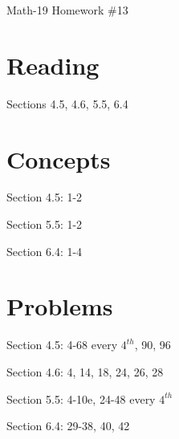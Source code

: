\documentclass[letterpaper,12pt,fleqn]{article}
\begin{document}
\begin{center}
\Large Math-19 Homework \#13
\end{center}

\section*{Reading}

Sections 4.5, 4.6, 5.5, 6.4

\section*{Concepts}

Section 4.5: 1-2

Section 5.5: 1-2

Section 6.4: 1-4

\section*{Problems}

Section 4.5: 4-68 every $4^{th}$, 90, 96

Section 4.6: 4, 14, 18, 24, 26, 28

Section 5.5: 4-10e, 24-48 every $4^{th}$

Section 6.4: 29-38, 40, 42
\end{document}
